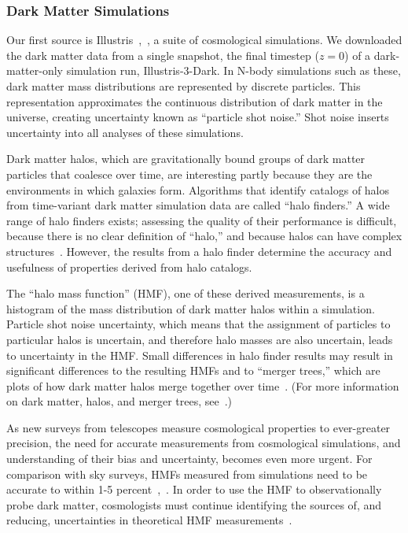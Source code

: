 
\subsubsection{Dark Matter Simulations}
\label{dark_matter}
Our first source is Illustris~\cite{illustris_original},~\cite{illustris_release}, a suite of cosmological simulations. We downloaded the dark matter data from a single snapshot, the final timestep ($z=0$) of a dark-matter-only simulation run, Illustris-3-Dark. In N-body simulations such as these, dark matter mass distributions are represented by discrete particles. This representation approximates the continuous distribution of dark matter in the universe, creating uncertainty known as ``particle shot noise.'' Shot noise inserts uncertainty into all analyses of these simulations.


Dark matter halos, which are gravitationally bound groups of dark matter particles that coalesce over time, are interesting partly because they are the environments in which galaxies form.  Algorithms that identify catalogs of halos from time-variant dark matter simulation data are called ``halo finders.'' A wide range of halo finders exists; assessing the quality of their performance is difficult, because there is no clear definition of ``halo,'' and because halos can have complex structures~\cite{behroozi}. However, the results from a halo finder determine the accuracy and usefulness of properties derived from halo catalogs. 

The ``halo mass function'' (HMF), one of these derived measurements, is a histogram of the mass distribution of dark matter halos within a simulation. Particle shot noise uncertainty, which means that the assignment of particles to particular halos is uncertain, and therefore halo masses are also uncertain, leads to uncertainty in the HMF.  Small differences in halo finder results may result in significant differences to the resulting HMFs and to ``merger trees,'' which are plots of how dark matter halos merge together over time~\cite{avila2014sussing}. (For more information on dark matter, halos, and merger trees, see~\cite{lacey1992}.)

As new surveys from telescopes measure cosmological properties to ever-greater precision, the need for accurate measurements from cosmological simulations, and understanding of their bias and uncertainty, becomes even more urgent. For comparison with sky surveys, HMFs measured from simulations need to be accurate to within 1-5 percent~\cite{behroozi},~\cite{tinker}. In order to use the HMF to observationally probe dark matter, cosmologists must continue identifying the sources of, and reducing, uncertainties in theoretical HMF measurements~\cite{murray2013}.
          
